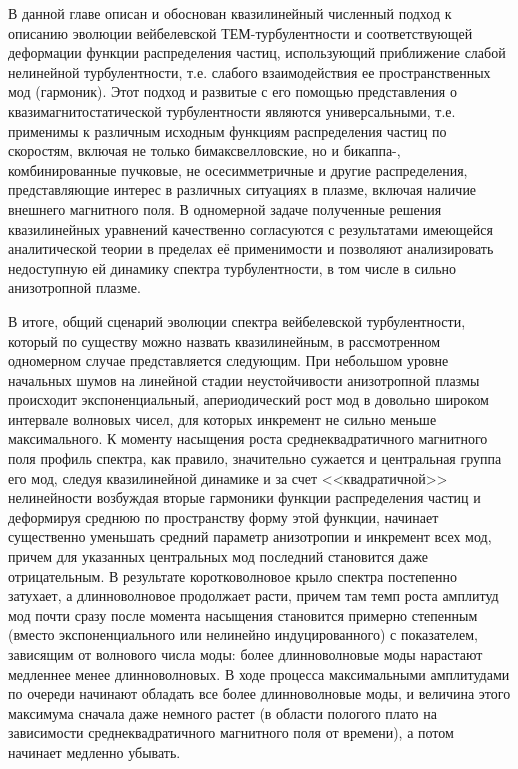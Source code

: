 В данной главе описан и обоснован квазилинейный численный подход к описанию эволюции вейбелевской ТЕМ-турбулентности и соответствующей деформации функции распределения частиц, использующий приближение слабой нелинейной турбулентности, т.е. слабого взаимодействия ее пространственных мод (гармоник). 
Этот подход и развитые с его помощью представления о квазимагнитостатической турбулентности являются универсальными, т.е. применимы к различным исходным функциям распределения частиц по скоростям, включая не только бимаксвелловские, но и бикаппа-, комбинированные пучковые, не осесимметричные и другие распределения, представляющие интерес в различных ситуациях в плазме, включая наличие внешнего магнитного поля. 
В одномерной задаче полученные решения квазилинейных уравнений качественно согласуются с результатами имеющейся аналитической теории в пределах её применимости и позволяют анализировать недоступную ей динамику спектра турбулентности, в том числе в сильно анизотропной плазме. 

В итоге, общий сценарий эволюции спектра вейбелевской турбулентности, который по существу можно назвать квазилинейным, в рассмотренном одномерном случае представляется следующим. При небольшом уровне начальных шумов на линейной стадии неустойчивости анизотропной плазмы происходит экспоненциальный, апериодический рост мод в довольно широком интервале волновых чисел, для которых инкремент не сильно меньше максимального. К моменту насыщения роста среднеквадратичного магнитного поля профиль спектра, как правило, значительно сужается и центральная группа его мод, следуя квазилинейной динамике и за счет <<квадратичной>> нелинейности возбуждая вторые гармоники функции распределения частиц и деформируя среднюю по пространству форму этой функции, начинает существенно уменьшать средний параметр анизотропии и инкремент всех мод, причем для указанных центральных мод последний становится даже отрицательным. В результате коротковолновое крыло спектра постепенно затухает, а длинноволновое продолжает расти, причем там темп роста амплитуд мод почти сразу после момента насыщения становится примерно степенным (вместо экспоненциального или нелинейно индуцированного) с показателем, зависящим от волнового числа моды: более длинноволновые моды нарастают медленнее менее длинноволновых. В ходе процесса максимальными амплитудами по очереди начинают обладать все более длинноволновые моды, и величина этого максимума сначала даже немного растет (в области пологого плато на зависимости среднеквадратичного магнитного поля от времени), а потом начинает медленно убывать.

